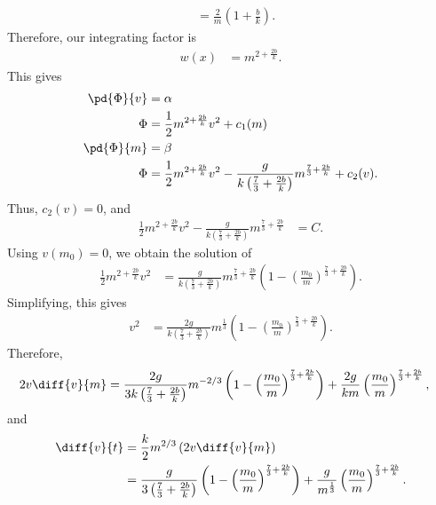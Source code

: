 \documentclass[10pt]{mypackage}
\begin{document}
\begin{solution}[38.6]
\begin{enumerate}[(a)]
\begin{align*}
             &= \frac{2}{m}\left( 1 + \frac{b}{k} \right).
      \end{align*}
      Therefore, our integrating factor is
      \begin{align*}
        w(x) &= m^{2 + \frac{2b}{k}}.
      \end{align*}
      This gives
      \begin{align*}
        \pd{\Phi}{v} &= \alpha\\
                     \Phi &= \frac{1}{2}m^{2 + \frac{2b}{k}}v^2 + c_1(m)\\
        \pd{\Phi}{m} &= \beta\\
        \Phi &= \frac{1}{2}m^{2 + \frac{2b}{k}}v^2 - \frac{g}{k\left( \frac{7}{3} + \frac{2b}{k} \right)}m^{\frac{7}{3} + \frac{2b}{k}} + c_2(v).
      \end{align*}
      Thus, $c_2(v) = 0$, and
      \begin{align*}
        \frac{1}{2}m^{2 + \frac{2b}{k}}v^2 - \frac{g}{k\left( \frac{7}{3} + \frac{2b}{k} \right)}m^{\frac{7}{3} + \frac{2b}{k}} &= C.
      \end{align*}
      Using $v\left( m_0 \right) = 0$, we obtain the solution of
      \begin{align*}
        \frac{1}{2}m^{2 + \frac{2b}{k}}v^2 &= \frac{g}{k\left( \frac{7}{3} + \frac{2b}{k} \right)}m^{\frac{7}{3} + \frac{2b}{k}} \left( 1-\left( \frac{m_0}{m} \right)^{\frac{7}{3} + \frac{2b}{k}} \right).
      \end{align*}
      Simplifying, this gives
      \begin{align*}
        v^2 &= \frac{2g}{k\left( \frac{7}{3} + \frac{2b}{k} \right)}m^{\frac{1}{3}}\left( 1-\left( \frac{m_0}{m} \right)^{\frac{7}{3} + \frac{2b}{k}} \right).
      \end{align*}
      Therefore,
      \begin{align*}
        2v \diff{v}{m} &= \frac{2g}{3k\left( \frac{7}{3} + \frac{2b}{k} \right)}m^{-2/3}\left( 1-\left( \frac{m_0}{m} \right)^{\frac{7}{3} + \frac{2b}{k}} \right) + \frac{2g}{km}\left( \frac{m_0}{m} \right)^{\frac{7}{3} + \frac{2b}{k}},
      \end{align*}
      and
      \begin{align*}
        \diff{v}{t} &= \frac{k}{2}m^{2/3}\left( 2v\diff{v}{m} \right)\\
                    &= \frac{g}{3\left( \frac{7}{3} + \frac{2b}{k} \right)}\left( 1 - \left( \frac{m_0}{m} \right)^{\frac{7}{3} + \frac{2b}{k}} \right) + \frac{g}{m^{\frac{1}{3}}}\left( \frac{m_0}{m} \right)^{\frac{7}{3} + \frac{2b}{k}}.
      \end{align*}
  \end{enumerate}
\end{solution}
\end{document}
